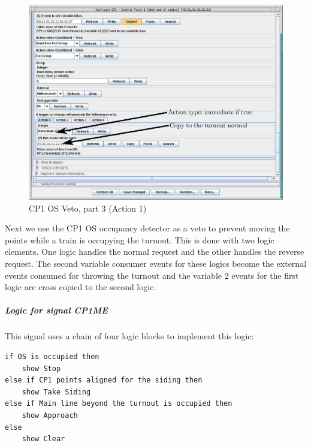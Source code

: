 \begin{figure}[hbpt]\begin{centering}%
\includegraphics[width=5in]{CP1-OSVeto-Normal3-Annotated.png}
\caption{CP1 OS Veto, part 3 (Action 1)}
\label{fig:CP1-OSVeto-Normal3}
\end{centering}\end{figure}                                                    
Next we use the CP1 OS occupancy detector as a veto to prevent moving the 
points while a train is occupying the turnout.  This is done with two logic 
elements.  One logic handles the normal request and the other handles the 
reverse request.  The second variable consumer events for these logics become 
the external events consumed for throwing the turnout and the variable 2 
events for the first logic are cross copied to the second logic.

\clearpage
\subparagraph{Logic for signal CP1ME}
This signal uses a chain of four logic blocks to implement this logic:
\begin{verbatim}
if OS is occupied then
    show Stop
else if CP1 points aligned for the siding then
    show Take Siding
else if Main line beyond the turnout is occupied then
    show Approach
else
    show Clear
\end{verbatim}

